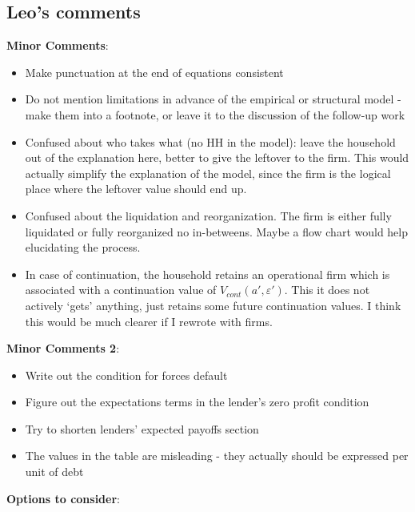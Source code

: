 \documentclass[12pt]{article}
\begin{document}
\subsection*{Leo's comments}
\textbf{Minor Comments}:
\begin{itemize}\setlength\itemsep{0em} \small
    \item Make punctuation at the end of equations consistent
    \item Do not mention limitations in advance of the empirical or structural model - make them into a footnote, or leave it to the discussion of the follow-up work
    \item Confused about who takes what (no HH in the model):  leave the household out of the explanation here, better to give the leftover to the firm. This would actually simplify the explanation of the model, since the firm is the logical place where the leftover value should end up.
    \item Confused about the liquidation and reorganization. The firm is either fully liquidated or fully reorganized no in-betweens. Maybe a flow chart would help elucidating the process. 
    \item In case of continuation, the household retains an operational firm which is associated with a continuation value of $V_{cont}(a',\varepsilon')$. This it does not actively `gets' anything, just retains some future continuation values. I think this would be much clearer if I rewrote with firms. 
\end{itemize} \normalsize
\textbf{Minor Comments 2}:
\begin{itemize}\setlength\itemsep{0em} \small
    \item Write out the condition for forces default
    \item Figure out the expectations terms in the lender's zero profit condition
    \item Try to shorten lenders' expected payoffs section
    \item The values in the table are misleading - they actually should be expressed per unit of debt
\end{itemize} \normalsize
\textbf{Options to consider}:
\end{document}
